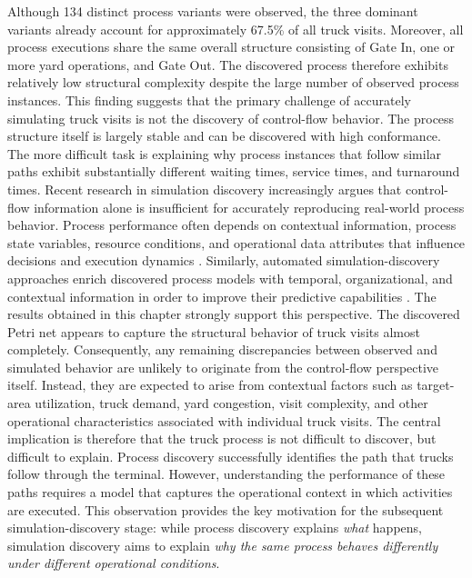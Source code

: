 Although 134 distinct process variants were observed, the three dominant variants already account for approximately 67.5\% of all truck visits. Moreover, all process executions share the same overall structure consisting of Gate In, one or more yard operations, and Gate Out. The discovered process therefore exhibits relatively low structural complexity despite the large number of observed process instances. This finding suggests that the primary challenge of accurately simulating truck visits is not the discovery of control-flow behavior. The process structure itself is largely stable and can be discovered with high conformance. The more difficult task is explaining why process instances that follow similar paths exhibit substantially different waiting times, service times, and turnaround times. Recent research in simulation discovery increasingly argues that control-flow information alone is insufficient for accurately reproducing real-world process behavior. Process performance often depends on contextual information, process state variables, resource conditions, and operational data attributes that influence decisions and execution dynamics \cite{Vinci2023Inf.Activ.Prob,mannhardt2023stochasticProcessesModelling,lopez2024}. Similarly, automated simulation-discovery approaches enrich discovered process models with temporal, organizational, and contextual information in order to improve their predictive capabilities \cite{PMRozinat2009,Camargo2020,simod2024}. The results obtained in this chapter strongly support this perspective. The discovered Petri net appears to capture the structural behavior of truck visits almost completely. Consequently, any remaining discrepancies between observed and simulated behavior are unlikely to originate from the control-flow perspective itself. Instead, they are expected to arise from contextual factors such as target-area utilization, truck demand, yard congestion, visit complexity, and other operational characteristics associated with individual truck visits. The central implication is therefore that the truck process is not difficult to discover, but difficult to explain. Process discovery successfully identifies the path that trucks follow through the terminal. However, understanding the performance of these paths requires a model that captures the operational context in which activities are executed. This observation provides the key motivation for the subsequent simulation-discovery stage: while process discovery explains \emph{what} happens, simulation discovery aims to explain \emph{why the same process behaves differently under different operational conditions}.


